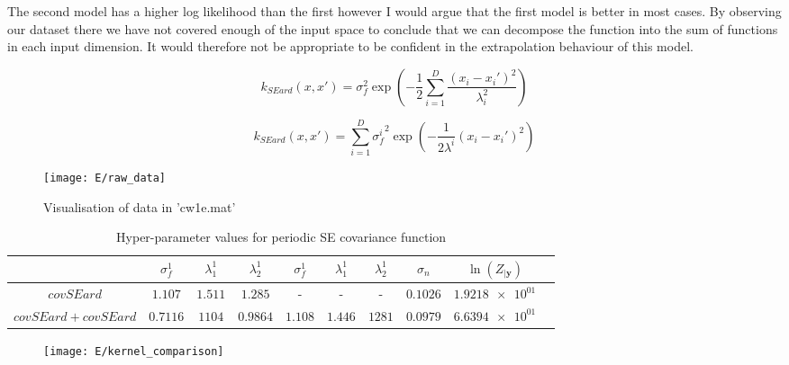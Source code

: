 \documentclass[11pt]{article}
\begin{document}
The second model has a higher log likelihood than the first however I would argue that the first model is better in most cases. By observing our dataset there we have not covered enough of the input space to conclude that we can decompose the function into the sum of functions in each input dimension. It would therefore not be appropriate to be confident in the extrapolation behaviour of this model.


\[k_{SEard}(x, x') = \sigma_f^2 \exp(-\frac{1}{2}\sum_{i=1}^{D} \frac{(x_i - x_i')^2}{\lambda_i^2})\]

\[k_{SEard}(x, x') = \sum_{i=1}^{D} {\sigma_f^i}^2 \exp(-\frac{1}{2 \lambda^i} (x_i - x_i')^2)\]

\begin{figure}[h]
    \centering
    \texttt{[image: E/raw\_data]}
    \caption{Visualisation of data in 'cw1e.mat'}
    \label{fig:E_data_vis}
\end{figure}

\begin{table*}[h]
    \centering
    \small
    \begin{tabular}{|c|c|c|c|c|c|c|c|c|c|}
        \hline
         & $\sigma_f^1$ & $\lambda_1^1$ & $\lambda_2^1$ & $\sigma_f^1$ & $\lambda_1^1$ & $\lambda_2^1$ & $\sigma_n$ & $\ln(Z_{|\textbf{y}})$ \\
        \hline
        $covSEard$ & $1.107$ & $1.511$ & $1.285$ & - & - & - & $0.1026$ & $\num{1.9218e+01}$ \\ 
        $covSEard + covSEard$ & $0.7116$ & $1104$ & $0.9864$ & $1.108$ & $1.446$ & $1281$ & $0.0979$ & $\num{6.6394e+01}$ \\
        \hline
    \end{tabular}
    \caption{Hyper-parameter values for periodic SE covariance function}
    \label{table:E_hyper_parameters}
\end{table*}

\begin{figure}[h]
    \centering
    \texttt{[image: E/kernel\_comparison]}
    \caption{}
    \label{fig:E_kernel_compare}
\end{figure}

    
\end{document}
